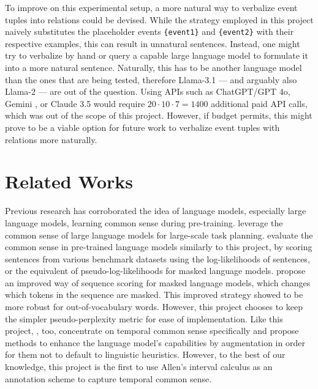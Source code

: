 \documentclass[11pt]{article}
\begin{document}
To improve on this experimental setup, a more natural way to verbalize event tuples into relations could be devised. While the strategy employed in this project naively substitutes the placeholder events \texttt{\{event1\}} and \texttt{\{event2\}} with their respective examples, this can result in unnatural sentences. Instead, one might try to verbalize by hand or query a capable large language model to formulate it into a more natural sentence. Naturally, this has to be another language model than the ones that are being tested, therefore Llama-3.1 --- and arguably also Llama-2 --- are out of the question. Using APIs such as ChatGPT/GPT 4o, Gemini \citep{gemini}, or Claude 3.5 would require $20\cdot10\cdot7 = 1400$ additional paid API calls, which was out of the scope of this project. However, if budget permits, this might prove to be a viable option for future work to verbalize event tuples with relations more naturally.


\section{Related Works}
Previous research has corroborated the idea of language models, especially large language models, learning common sense during pre-training. \citet{task_planning} leverage the common sense of large language models for large-scale task planning. \citet{evaluating} evaluate the common sense in pre-trained language models similarly to this project, by scoring sentences from various benchmark datasets using the log-likelihoods of sentences, or the equivalent of pseudo-log-likelihoods for masked language models. \citet{better_scoring} propose an improved way of sequence scoring for masked language models, which changes which tokens in the sequence are masked. This improved strategy showed to be more robust for out-of-vocabulary words. However, this project chooses to keep the simpler pseudo-perplexity metric for ease of implementation. Like this project, \citet{overview}, too, concentrate on temporal common sense specifically and propose methods to enhance the language model's capabilities by augmentation in order for them not to default to linguistic heuristics. However, to the best of our knowledge, this project is the first to use Allen's interval calculus as an annotation scheme to capture temporal common sense.

% 


\end{document}
